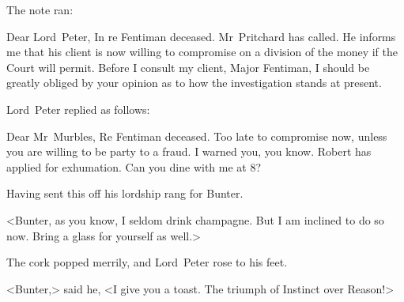 The note ran:


\begin{mail}{}{Dear Lord~Peter,}
In re Fentiman deceased. Mr~Pritchard has called. He informs me that his client is now willing to compromise on a division of the money if the Court will permit. Before I consult my client, Major Fentiman, I should be greatly obliged by your opinion as to how the investigation stands at present.
\end{mail}

\begin{letter}
	\clearpage
\end{letter}

Lord~Peter replied as follows:

\begin{mail}{}{Dear Mr~Murbles,}
Re Fentiman deceased. Too late to compromise now, unless you are willing to be party to a fraud. I warned you, you know. Robert has applied for exhumation. Can you dine with me at 8?
\end{mail}

Having sent this off his lordship rang for Bunter.

<Bunter, as you know, I seldom drink champagne. But I am inclined to do so now. Bring a glass for yourself as well.>

The cork popped merrily, and Lord~Peter rose to his feet.

<Bunter,> said he, <I give you a toast. The triumph of Instinct over Reason!>